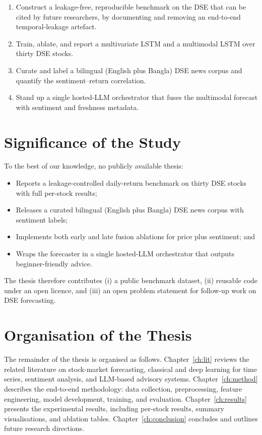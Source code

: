 \documentclass[12pt,a4paper,oneside]{report}
\begin{document}
\begin{enumerate}[label=\textbf{O\arabic*}, leftmargin=*,itemsep=2pt]
  \item Construct a leakage-free, reproducible benchmark on the DSE
        that can be cited by future researchers, by documenting and
        removing an end-to-end temporal-leakage artefact.
  \item Train, ablate, and report a multivariate \ac{LSTM} and a
        multimodal \ac{LSTM} over thirty DSE stocks.
  \item Curate and label a bilingual (English plus Bangla) DSE news
        corpus and quantify the sentiment--return correlation.
  \item Stand up a single hosted-\ac{LLM} orchestrator that fuses
        the multimodal forecast with sentiment and freshness
        metadata.
\end{enumerate}

\section{Significance of the Study}

To the best of our knowledge, no publicly available thesis:
\begin{itemize}[leftmargin=*,itemsep=2pt]
  \item Reports a leakage-controlled daily-return benchmark on
        thirty DSE stocks with full per-stock results;
  \item Releases a curated bilingual (English plus Bangla) DSE news
        corpus with sentiment labels;
  \item Implements both early and late fusion ablations for price
        plus sentiment; and
  \item Wraps the forecaster in a single hosted-\ac{LLM}
        orchestrator that outputs beginner-friendly
        advice.
\end{itemize}
The thesis therefore contributes (i) a public benchmark dataset,
(ii) reusable code under an open licence, and (iii) an open
problem statement for follow-up work on DSE forecasting.

\section{Organisation of the Thesis}

The remainder of the thesis is organised as follows.
Chapter~\ref{ch:lit} reviews the related literature on stock-market
forecasting, classical and deep learning for time series, sentiment
analysis, and \ac{LLM}-based advisory systems.
Chapter~\ref{ch:method} describes the end-to-end methodology: data
collection, preprocessing, feature engineering, model development,
training, and evaluation. Chapter~\ref{ch:results} presents the
experimental results, including per-stock results, summary
visualisations, and ablation tables. Chapter~\ref{ch:conclusion}
concludes and outlines future research directions.
\end{document}
